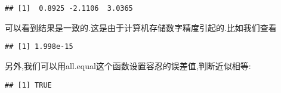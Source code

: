 \documentclass[]{ctexbook}
\newenvironment{Shaded}{\begin{snugshade}}{\end{snugshade}}
\newcommand{\DataTypeTok}[1]{\textcolor[rgb]{0.13,0.29,0.53}{#1}}
\newcommand{\DecValTok}[1]{\textcolor[rgb]{0.00,0.00,0.81}{#1}}
\newcommand{\FloatTok}[1]{\textcolor[rgb]{0.00,0.00,0.81}{#1}}
\newcommand{\KeywordTok}[1]{\textcolor[rgb]{0.13,0.29,0.53}{\textbf{#1}}}
\newcommand{\NormalTok}[1]{#1}
\newcommand{\OperatorTok}[1]{\textcolor[rgb]{0.81,0.36,0.00}{\textbf{#1}}}
\begin{document}
\begin{verbatim}
## [1]  0.8925 -2.1106  3.0365
\end{verbatim}

可以看到结果是一致的.这是由于计算机存储数字精度引起的.比如我们查看

\begin{Shaded}
\end{Shaded}

\begin{verbatim}
## [1] 1.998e-15
\end{verbatim}

另外,我们可以用all.equal这个函数设置容忍的误差值,判断近似相等:

\begin{Shaded}
\end{Shaded}

\begin{verbatim}
## [1] TRUE
\end{verbatim}
\end{document}

